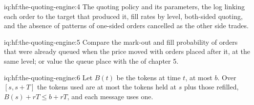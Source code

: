 \begin{solution}{iq:hf:the-quoting-engine:4}
The quoting policy and its parameters, the log linking each order to the target that produced it, fill rates by level, both-sided quoting, and the
absence of patterns of one-sided orders cancelled as the other side trades.
\end{solution}

\begin{solution}{iq:hf:the-quoting-engine:5}
Compare the mark-out and fill probability of orders that were already queued when the price moved with orders placed after it, at the same level;
or value the queue place with the  of chapter 5.
\end{solution}

\begin{solution}{iq:hf:the-quoting-engine:6}
Let $B(t)$ be the tokens at time $t$, at most $b$. Over $[s,s+T]$ the tokens used are at most the tokens held at $s$ plus those refilled,
$B(s)+rT\le b+rT$, and each message uses one.
\end{solution}
